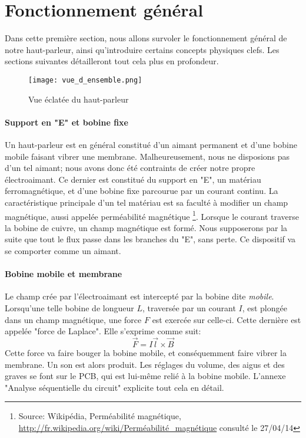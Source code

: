 

\section{Fonctionnement général}

Dans cette première section, nous allons survoler le fonctionnement général de notre haut-parleur, ainsi 
qu'introduire certains concepts physiques clefs. Les sections suivantes détailleront tout cela plus en 
profondeur.

\begin{figure}[ht!] 
\centering 
\texttt{[image: vue\_d\_ensemble.png]} 
\caption{Vue éclatée du haut-parleur} 
\label{hp-scheme} 
\end{figure}

\paragraph{Support en "E" et bobine fixe}

Un haut-parleur est en général constitué d'un aimant permanent et d'une bobine mobile faisant vibrer une 
membrane. Malheureusement, nous ne disposions pas d'un tel aimant; nous avons donc été contraints de créer
notre propre électroaimant. Ce dernier est constitué du support en "E", un matériau ferromagnétique, et 
d'une bobine fixe parcourue par un courant continu. La caractéristique principale d'un tel matériau est sa 
faculté à modifier un champ magnétique, aussi appelée perméabilité magnétique \footnote{Source: Wikipédia, 
Perméabilité magnétique, \url{http://fr.wikipedia.org/wiki/Perméabilité_magnétique} consulté le 27/04/14 }.
Lorsque le courant traverse la bobine de cuivre, un champ magnétique est formé. Nous supposerons par la 
suite que tout le flux passe dans les branches du "E", sans perte. Ce dispositif va se comporter comme un
aimant.



\paragraph{Bobine mobile et membrane}


Le champ crée par l'électroaimant est intercepté par la bobine dite \textit{mobile}. Lorsqu'une telle bobine
de longueur $L$, traversée par un courant $I$, est plongée dans un champ magnétique, une force $F$ est exercée
sur celle-ci. Cette dernière est appelée "force de Laplace". Elle s'exprime comme suit:
$$\vec{F} = I\vec{l}\times{\vec{B}}$$ 
Cette force va faire bouger la bobine mobile, et conséquemment faire vibrer la membrane. Un son est alors 
produit. Les réglages du volume, des aigus et des graves se font sur le PCB, qui est lui-même relié à la
bobine mobile. L'annexe "Analyse séquentielle du circuit" explicite tout cela en détail.




